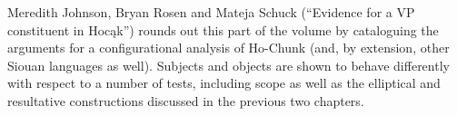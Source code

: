 \begin{refsection}
Meredith Johnson, Bryan Rosen and Mateja Schuck (``Evidence for a VP constituent in Hoc\k{a}k'') rounds out this part of the volume by cataloguing the arguments for a configurational analysis of Ho-Chunk (and, by extension, other Siouan languages as well). Subjects and objects are shown to behave differently with respect to a number of tests, including scope as well as the elliptical and resultative constructions discussed in the previous two chapters.







\end{refsection}

